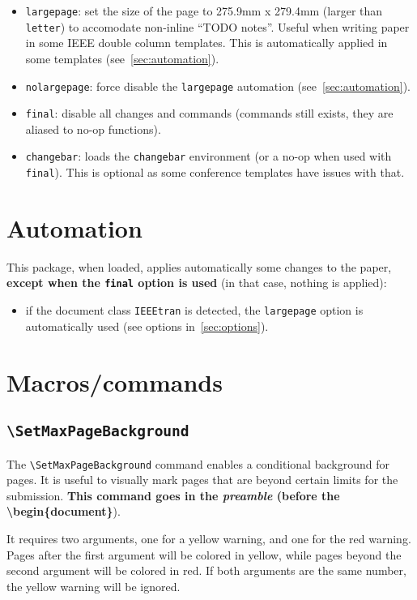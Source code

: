 \documentclass[a4paper]{article}
\newcommand\B[1]{\texttt{\textbackslash #1}}
\begin{document}
\begin{itemize}
    \item \texttt{largepage}: set the size of the page to 275.9mm x 279.4mm (larger than \texttt{letter}) to accomodate non-inline ``TODO notes''. Useful when writing paper in some IEEE double column templates. This is automatically applied in some templates (see~\autoref{sec:automation}).
    \item \texttt{nolargepage}: force disable the \texttt{largepage} automation (see~\autoref{sec:automation}).
    \item \texttt{final}: disable all changes and commands (commands still exists, they are aliased to no-op functions).
    \item \texttt{changebar}: loads the \texttt{changebar} environment (or a no-op when used with \texttt{final}). This is optional as some conference templates have issues with that.
\end{itemize}


\section{Automation}
\label{sec:automation}

This package, when loaded, applies automatically some changes to the paper, \textbf{except when the \texttt{final} option is used} (in that case, nothing is applied):

\begin{itemize}
	\item if the document class \texttt{IEEEtran} is detected, the \texttt{largepage} option is automatically used (see options in~\autoref{sec:options}).
\end{itemize}


\section{Macros/commands}

\subsection{\B{SetMaxPageBackground}}

The \B{SetMaxPageBackground} command enables a conditional background for pages. It is useful to visually mark pages that are beyond certain limits for the submission. \textbf{This command goes in the \textit{preamble} (before the \textbackslash begin\{document\}}).

It requires two arguments, one for a yellow warning, and one for the red warning. Pages after the first argument will be colored in yellow, while pages beyond the second argument will be colored in red. If both arguments are the same number, the yellow warning will be ignored.
\end{document}
